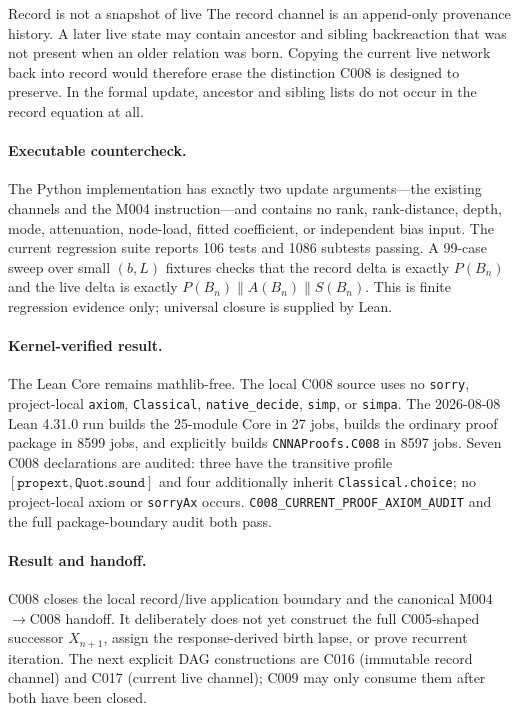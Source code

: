 \begin{cnnaInfoBox}{Record is not a snapshot of live}
The record channel is an append-only provenance history.  A later live state may
contain ancestor and sibling backreaction that was not present when an older
relation was born.  Copying the current live network back into record would
therefore erase the distinction C008 is designed to preserve.  In the formal
update, ancestor and sibling lists do not occur in the record equation at all.
\end{cnnaInfoBox}

\paragraph*{Executable countercheck.}
The Python implementation has exactly two update arguments---the existing
channels and the M004 instruction---and contains no rank, rank-distance, depth,
mode, attenuation, node-load, fitted coefficient, or independent bias input.
The current regression suite reports 106 tests and 1086 subtests passing.  A
99-case sweep over small $(b,L)$ fixtures checks that the record delta is exactly
$P(B_n)$ and the live delta is exactly $P(B_n)\|A(B_n)\|S(B_n)$.  This is finite
regression evidence only; universal closure is supplied by Lean.

\paragraph*{Kernel-verified result.}
The Lean Core remains mathlib-free.  The local C008 source uses no
\texttt{sorry}, project-local \texttt{axiom}, \texttt{Classical},
\texttt{native\_decide}, \texttt{simp}, or \texttt{simpa}.  The 2026-08-08
Lean 4.31.0 run builds the 25-module Core in 27 jobs, builds the ordinary proof
package in 8599 jobs, and explicitly builds \texttt{CNNAProofs.C008} in 8597
jobs.  Seven C008 declarations are audited: three have the transitive profile
$[\texttt{propext},\texttt{Quot.sound}]$ and four additionally inherit
\texttt{Classical.choice}; no project-local axiom or \texttt{sorryAx} occurs.
\texttt{C008\_CURRENT\_PROOF\_AXIOM\_AUDIT} and the full package-boundary audit
both pass.

\paragraph*{Result and handoff.}
C008 closes the local record/live application boundary and the canonical
M004$\to$C008 handoff.  It deliberately does not yet construct the full
C005-shaped successor $X_{n+1}$, assign the response-derived birth lapse, or
prove recurrent iteration.  The next explicit DAG constructions are C016
(immutable record channel) and C017 (current live channel); C009 may only consume
them after both have been closed.

